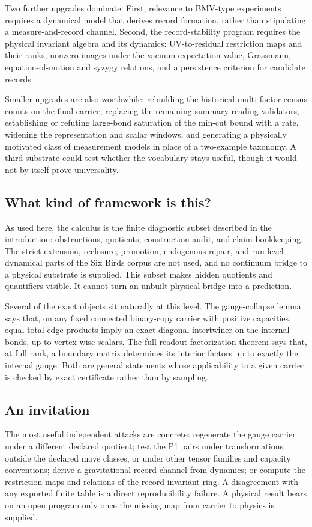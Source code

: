 Two further upgrades dominate. First, relevance to BMV-type experiments requires a dynamical model that derives record
formation, rather than stipulating a measure-and-record channel. Second, the record-stability program requires the
physical invariant algebra and its dynamics: UV-to-residual restriction maps and their ranks, nonzero images under the
vacuum expectation value, Grassmann, equation-of-motion and syzygy relations, and a persistence criterion for candidate
records.

Smaller upgrades are also worthwhile: rebuilding the historical multi-factor census counts on the final carrier,
replacing the remaining summary-reading validators, establishing or refuting large-bond saturation of the min-cut bound
with a rate, widening the representation and scalar windows, and generating a physically motivated class of
measurement models in place of a two-example taxonomy. A third substrate could test whether the vocabulary stays
useful, though it would not by itself prove universality.

\subsection{What kind of framework is this?}\label{what-kind-of-theory-is-this}

As used here, the calculus is the finite diagnostic subset described in the introduction: obstructions, quotients,
construction audit, and claim bookkeeping. The strict-extension, reclosure, promotion, endogenous-repair, and run-level
dynamical parts of the Six Birds corpus are not used, and no continuum bridge to a physical substrate is supplied. This
subset makes hidden quotients and quantifiers visible. It cannot turn an unbuilt physical bridge into a prediction.

Several of the exact objects sit naturally at this level. The gauge-collapse lemma says that, on any fixed connected
binary-copy carrier with positive capacities, equal total edge products imply an exact diagonal intertwiner on the
internal bonds, up to vertex-wise scalars. The full-readout factorization theorem says that, at full rank, a boundary
matrix determines its interior factors up to exactly the internal gauge. Both are general statements whose
applicability to a given carrier is checked by exact certificate rather than by sampling.

\subsection{An invitation}\label{an-invitation}

The most useful independent attacks are concrete: regenerate the gauge carrier under a different declared quotient;
test the P1 pairs under transformations outside the declared move classes, or under other tensor families and capacity
conventions; derive a gravitational record channel from dynamics; or compute the restriction maps and relations of the
record invariant ring. A disagreement with any exported finite table is a direct reproducibility failure. A physical
result bears on an open program only once the missing map from carrier to physics is supplied.
